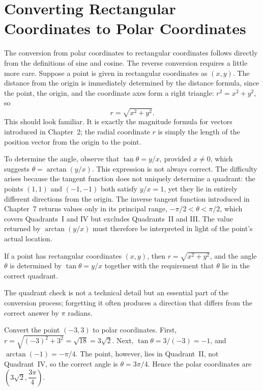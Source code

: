 \section{Converting Rectangular Coordinates to Polar Coordinates}

The conversion from polar coordinates to rectangular coordinates follows
directly from the definitions of sine and cosine. The reverse conversion
requires a little more care. Suppose a point is given in rectangular
coordinates as $(x,y)$. The distance from the origin is immediately
determined by the distance formula, since the point, the origin, and the
coordinate axes form a right triangle: $r^2 = x^2+y^2$, so
\[
r = \sqrt{x^2+y^2}.
\]
This should look familiar. It is exactly the magnitude formula for
vectors introduced in Chapter~2; the radial coordinate $r$ is simply the
length of the position vector from the origin to the point.

To determine the angle, observe that $\tan\theta = y/x$, provided
$x\neq0$, which suggests $\theta = \arctan(y/x)$. This expression is not
always correct. The difficulty arises because the tangent function does
not uniquely determine a quadrant: the points $(1,1)$ and $(-1,-1)$ both
satisfy $y/x = 1$, yet they lie in entirely different directions from the
origin. The inverse tangent function introduced in Chapter~7 returns
values only in its principal range, $-\pi/2 < \theta < \pi/2$, which
covers Quadrants~I and IV but excludes Quadrants~II and III. The value
returned by $\arctan(y/x)$ must therefore be interpreted in light of the
point's actual location.

\begin{theorem}
If a point has rectangular coordinates $(x,y)$, then $r = \sqrt{x^2+y^2}$,
and the angle $\theta$ is determined by $\tan\theta = y/x$ together with
the requirement that $\theta$ lie in the correct quadrant.
\end{theorem}

The quadrant check is not a technical detail but an essential part of the
conversion process; forgetting it often produces a direction that differs
from the correct answer by $\pi$ radians.

\begin{example}
Convert the point $(-3,3)$ to polar coordinates. First, $r =
\sqrt{(-3)^2+3^2} = \sqrt{18} = 3\sqrt2$. Next, $\tan\theta = 3/(-3) =
-1$, and $\arctan(-1) = -\pi/4$. The point, however, lies in
Quadrant~II, not Quadrant~IV, so the correct angle is $\theta = 3\pi/4$.
Hence the polar coordinates are $\left(3\sqrt2, \dfrac{3\pi}{4}\right)$.
\end{example}

